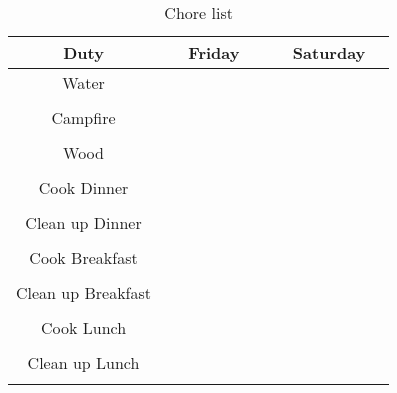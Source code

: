 \documentclass[14pt,english]{extarticle}
\begin{document}
\begin{table}[h!]
	\caption{Chore list}
	\centering
	\bigskip
	\begin{tabular}{c|c|c}
		\hline
		\,\,\,\,Duty\,\,\,\, & \,\,\,\,\,\,\,\,Friday\,\,\,\,\,\,\,\, & \,\,\,\,\,\,Saturday\,\,\,\,\,\, \\ \hline
		Water & & \\ 
		 & & \\ \hline
		Campfire & & \\ 
		 & & \\ \hline
		Wood & & \\ 
		 & & \\ \hline
		Cook Dinner & & \\ 
		 & & \\ \hline
		Clean up Dinner & & \\ 
		 & & \\ \hline
		Cook Breakfast & & \\ 
		 & & \\ \hline
		Clean up Breakfast & & \\ 
		 & & \\ \hline
		Cook Lunch & & \\ 
		 & & \\ \hline
		Clean up Lunch & & \\ 
		 & & \\ 
		\hline
	\end{tabular}
	\label{tab:chores}
\end{table}
\end{document}
